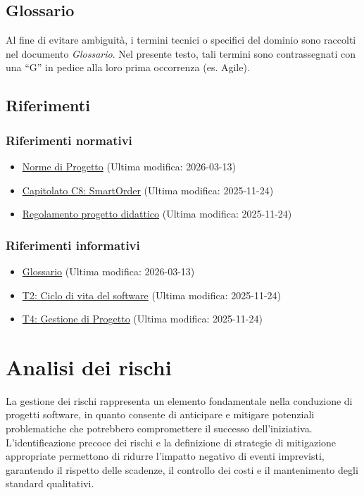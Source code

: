 \documentclass[a4paper, 11pt, oneside]{scrartcl} %
\begin{document}
\subsection{Glossario}
Al fine di evitare ambiguità, i termini tecnici o specifici del dominio sono raccolti nel documento \textit{Glossario}. Nel presente testo, tali termini sono contrassegnati con una “G” in pedice alla loro prima occorrenza (es. Agile{\scriptsize{}}).

\subsection{Riferimenti}
\subsubsection{Riferimenti normativi}
\begin{itemize}
    \item \href{https://github.com/swenightpro/Documentazione/blob/main/docs/RTB/Documentazione%20Interna/}{Norme di Progetto} (Ultima modifica: 2026-03-13)
    \item \href{https://www.math.unipd.it/~tullio/IS-1/2025/Progetto/C8.pdf}{Capitolato C8: SmartOrder} (Ultima modifica: 2025-11-24)
    \item \href{https://www.math.unipd.it/~tullio/IS-1/2025/Dispense/PD1.pdf}{Regolamento progetto didattico} (Ultima modifica: 2025-11-24)
\end{itemize}

\subsubsection{Riferimenti informativi}
\begin{itemize}
    \item \href{https://github.com/swenightpro/Documentazione/blob/main/docs/RTB/Documentazione%20Esterna}{Glossario} (Ultima modifica: 2026-03-13)
    \item \href{https://www.math.unipd.it/~tullio/IS-1/2025/Dispense/T02.pdf}{T2: Ciclo di vita del software} (Ultima modifica: 2025-11-24)
    \item \href{https://www.math.unipd.it/~tullio/IS-1/2025/Dispense/T04.pdf}{T4: Gestione di Progetto} (Ultima modifica: 2025-11-24)
\end{itemize}

\newpage
\section{Analisi dei rischi}
\label{sec:analisi_rischi}
La gestione dei rischi rappresenta un elemento fondamentale nella conduzione di progetti software, in quanto consente di anticipare e mitigare potenziali problematiche che potrebbero compromettere il successo dell'iniziativa. L'identificazione precoce dei rischi e la definizione di strategie di mitigazione appropriate permettono di ridurre l'impatto negativo di eventi imprevisti, garantendo il rispetto delle scadenze, il controllo dei costi e il mantenimento degli standard qualitativi.
\end{document}

